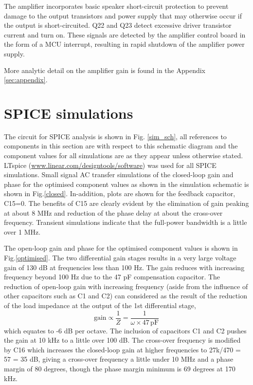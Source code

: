 \documentclass[a4paper,10pt, oneside]{article}
\begin{document}
The amplifier incorporates basic speaker short-circuit protection to prevent damage to the output transistors and power supply that may otherwise occur if the output is short-circuited. Q22 and Q23 detect excessive driver transistor current and turn on. These signals are detected by the amplifier control board in the form of a MCU interrupt, resulting in rapid shutdown of the amplifier power supply.  

More analytic detail on the amplifier gain is found in the Appendix \ref{sec:appendix}. 

\section{SPICE simulations}
The circuit for SPICE analysis is shown in Fig. \ref{sim_sch}, all references to components in this section are with respect to this schematic diagram and the component values for all simulations are as they appear unless otherwise stated. LTspice (\url{www.linear.com/designtools/software}) was used for all SPICE simulations. Small signal AC transfer simulations of the closed-loop gain and phase for the optimised component values as shown in the simulation schematic is shown in Fig.\ref{closed}. In-addition, plots are shown for the feedback capacitor, C15=0. The benefits of C15 are clearly evident by the elimination of gain peaking at about 8 MHz and reduction of the phase delay at about the cross-over frequency. Transient simulations indicate that the full-power bandwidth is a little over 1 MHz. 

The open-loop gain and phase for the optimised component values is shown in Fig.\ref{optimised}. The two differential gain stages results in a very large voltage gain of 130 dB at frequencies less than 100 Hz. The gain reduces with increasing frequency beyond 100 Hz due to the 47 pF compensation capacitor. 
The reduction of open-loop gain with increasing frequency (aside from the influence of other capacitors such as C1 and C2) can considered as the result of the reduction of the load impedance at the output of the 1st differential stage,
\begin{equation}
\textrm{gain} \propto \frac{1}{Z}=\frac{1}{\omega\times 47\,\textrm{pF}}
\end{equation}
which equates to -6 dB per octave. The inclusion of capacitors C1 and C2 pushes the gain at 10 kHz to a little over 100 dB. 
The cross-over frequency is modified by C16 which increases the closed-loop gain at higher frequencies to 27k/470 = 57 = 35 dB, giving 
a cross-over frequency a little under 10 MHz and a phase margin of 80 degrees, though the phase margin minimum is 69 degrees at 170 kHz. 
\end{document}
